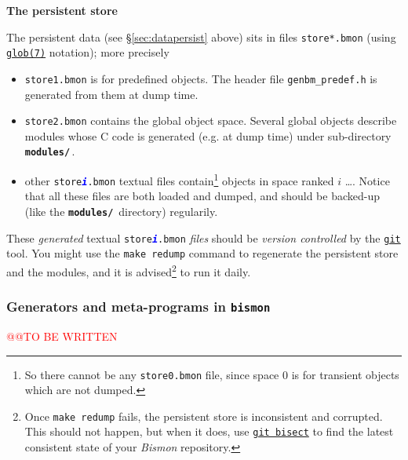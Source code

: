{\large \textbf{The persistent store}}

The persistent data (see \S \ref{sec:datapersist} above) sits in files
\texttt{store*.bmon} (using
\href{https://man7.org/linux/man-pages/man7/glob.7.html}{\texttt{glob(7)}}
notation); more precisely

\begin{itemize}

\item \texttt{store1.bmon} is for predefined objects. The header file
  \texttt{genbm\_predef.h} is generated from them at dump time.

\item \texttt{store2.bmon} contains the global object space. Several
  global objects describe modules whose C code is generated (e.g. at
  dump time)   under sub-directory
  \textbf{\texttt{modules/}}\,.

\item other \texttt{store\textcolor{blue}{\textbf{\textit{i}}}.bmon}
  textual files contain\footnote{So there cannot be any
    \texttt{store0.bmon} file, since space 0 is for transient objects
    which are not dumped.}  objects in space ranked $i$ \ldots. Notice
  that all these files are both loaded and dumped, and should be
  backed-up (like the \textbf{\texttt{modules/}}\, directory)
  regularily.

\end{itemize}

These \emph{generated} textual
\texttt{store\textcolor{blue}{\textit{\textbf{i}}}.bmon} \emph{files}
should be \emph{version controlled} by the
\href{https://git-scm.com/}{\texttt{git}} tool. You might use the \texttt{make
  redump} command to regenerate the persistent store and the modules,
and it is advised\footnote{Once \texttt{make redump} fails, the
  persistent store is inconsistent and corrupted. This should not
  happen, but when it does, use
  \href{https://git-scm.com/docs/git-bisect}{\texttt{git bisect}} to
  find the latest consistent state of your \textit{Bismon} repository.}
to run it daily.
  
\subsubsection{Generators and meta-programs in \texttt{bismon}}

{\textcolor{red}{\large @@TO BE WRITTEN}}
